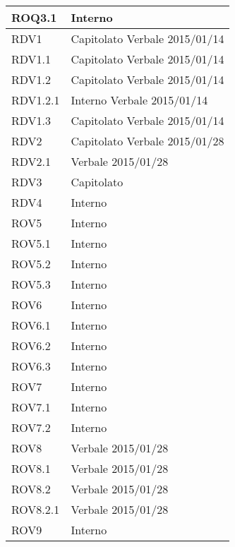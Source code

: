 \begin{center}
\begin{longtable}{| p{4cm} | p{4cm} |}
\hline
ROQ3.1   &  Interno \\
\hline
RDV1   &  Capitolato \newline Verbale 2015/01/14 \\
\hline
RDV1.1   &  Capitolato \newline Verbale 2015/01/14 \\
\hline
RDV1.2   &  Capitolato \newline Verbale 2015/01/14 \\
\hline
RDV1.2.1   &  Interno \newline Verbale 2015/01/14 \\
\hline
RDV1.3   &  Capitolato \newline Verbale 2015/01/14 \\
\hline
RDV2   &  Capitolato \newline Verbale 2015/01/28 \\
\hline
RDV2.1   &  Verbale 2015/01/28 \\
\hline
RDV3   &  Capitolato \\
\hline
RDV4   &  Interno \\
\hline
ROV5   &  Interno \\
\hline
ROV5.1   &  Interno \\
\hline
ROV5.2   &  Interno \\
\hline
ROV5.3   &  Interno \\
\hline
ROV6   &  Interno \\
\hline
ROV6.1   &  Interno \\
\hline
ROV6.2   &  Interno \\
\hline
ROV6.3   &  Interno \\
\hline
ROV7   &  Interno \\
\hline
ROV7.1   &  Interno \\
\hline
ROV7.2   &  Interno \\
\hline
ROV8   &  Verbale 2015/01/28 \\
\hline
ROV8.1   &  Verbale 2015/01/28 \\
\hline
ROV8.2   &  Verbale 2015/01/28 \\
\hline
ROV8.2.1   &  Verbale 2015/01/28 \\
\hline
ROV9   &  Interno \\
\hline
\end{longtable}
\egroup
\end{center}
